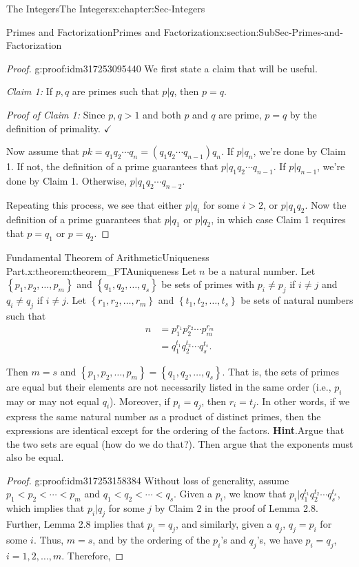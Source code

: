 \documentclass[oneside,10pt,]{book}
\newcommand{\blocktitlefont}{\relax}
\numberwithin{equation}{section}
\newcommand{\set}[1]{\left\{ {#1} \right\}}
\newcommand{\lt}{<}
\newcommand{\amp}{&}
\begin{document}
\begin{chapterptx}{The Integers}{}{The Integers}{}{}{x:chapter:Sec-Integers}
\begin{sectionptx}{Primes and Factorization}{}{Primes and Factorization}{}{}{x:section:SubSec-Primes-and-Factorization}
\begin{proof}{}{g:proof:idm317253095440}
We first state a claim that will be useful.%
\par
\emph{Claim 1:} If \(p,q\) are primes such that \(p|q\), then \(p = q\).%
\par
\emph{Proof of Claim 1:} Since \(p,
q > 1\) and both \(p\) and \(q\) are prime, \(p = q\) by the definition of primality. \(\checkmark\)%
\par
Now assume that \(pk = q_1 q_2 \cdots q_n = (q_1 q_2 \cdots q_{n-1}) q_n\). If \(p|q_n\), we're done by Claim 1. If not, the definition of a prime guarantees that \(p| q_1 q_2 \cdots q_{n-1}\). If \(p|q_{n-1}\), we're done by Claim 1. Otherwise, \(p|q_1 q_2 \cdots q_{n-2}\).%
\par
Repeating this process, we see that either \(p|q_i\) for some \(i > 2\), or \(p|q_1 q_2\). Now the definition of a prime guarantees that \(p|q_1\) or \(p|q_2\), in which case Claim 1 requires that \(p = q_1\) or \(p = q_2\).%
\end{proof}
\begin{theorem}{Fundamental Theorem of Arithmetic\textendash{}Uniqueness Part.}{}{x:theorem:theorem_FTAuniqueness}%
Let \(n\) be a natural number. Let \(\set{p_1,p_2,\ldots,p_m}\) and \(\set{q_1,q_2,\ldots,q_s}\) be sets of primes with \(p_i\ne p_j\) if \(i\ne j\) and \(q_i\ne q_j\) if \(i\ne j\). Let \(\set{r_1,r_2,\ldots,r_m}\) and \(\set{t_1,t_2,\ldots,t_s}\) be sets of natural numbers such that%
\begin{align*}
n \amp = p_1^{r_1} p_2^{r_2} \cdots p_m^{r_m}\\
\amp = q_1^{t_1} q_2^{t_2} \cdots q_s^{t_s}\text{.}
\end{align*}
%
\par
Then \(m = s\) and \(\set{p_1,p_2,\ldots,p_m} = \set{q_1,q_2,\ldots,q_s}\). That is, the sets of primes are equal but their elements are not necessarily listed in the same order (i.e., \(p_i\) may or may not equal \(q_i\)). Moreover, if \(p_i = q_j\), then \(r_i = t_j\). In other words, if we express the same natural number as a product of distinct primes, then the expressions are identical except for the ordering of the factors.%
\textbf{\blocktitlefont Hint}.\quad{}Argue that the two sets are equal (how do we do that?). Then argue that the exponents must also be equal.%
\end{theorem}
\begin{proof}{}{g:proof:idm317253158384}
Without loss of generality, assume \(p_1 \lt  p_2 \lt  \cdots \lt  p_m\) and \(q_1 \lt  q_2 \lt  \cdots \lt  q_s\). Given a \(p_i\), we know that \(p_i | q_1^{t_1} q_2^{t_2} \cdots q_s^{t_s}\), which implies that \(p_i | q_j\) for some \(j\) by Claim 2 in the proof of Lemma 2.8. Further, Lemma 2.8 implies that \(p_i = q_j\), and similarly, given a \(q_j\), \(q_j = p_i\) for some \(i\). Thus, \(m =s\), and by the ordering of the \(p_i\)'s and \(q_j\)'s, we have \(p_i = q_j\), \(i = 1, 2, \ldots, m\). Therefore,%

\end{proof}
\end{sectionptx}
\end{chapterptx}
\end{document}
